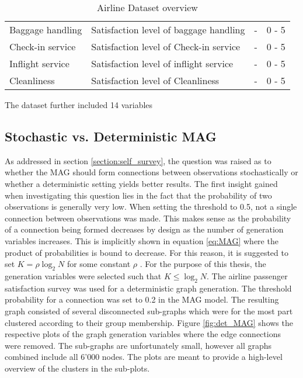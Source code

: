 \begin{landscape}
\begin{table}[h]
\begin{tabular}{|l|l|c|c|}
      Baggage handling & Satisfaction level of baggage handling & - & 0 - 5 \\
      Check-in service & Satisfaction level of Check-in service & - & 0 - 5 \\
      Inflight service & Satisfaction level of inflight service & - & 0 - 5 \\
      Cleanliness & Satisfaction level of Cleanliness & - & 0 - 5 \\
      \hline
    \end{tabular}
    \caption{Airline Dataset overview}
    \label{table:airline_summary}
  \end{table}
  \end{landscape}
  \newpage

  \noindent The dataset further included 14 variables 

  \subsection{Stochastic vs. Deterministic MAG}

  As addressed in section \ref{section:self_survey}, the question was raised 
  as to whether the MAG should form connections between observations
  stochastically or whether a deterministic setting yields better results. The 
  first insight gained when investigating this question lies in the fact that 
  the probability of two observations is generally very low. When setting the 
  threshold to 0.5, not a single connection between observations was made. This
  makes sense as the probability of a connection being formed decreases by
  design as the number of generation variables increases. This is implicitly
  shown in equation \ref{eq:MAG} where the product of probabilities is bound to
  decrease. For this reason, it is suggested to set $K=\rho\log_{2}N$
  for some constant $\rho$ \citep[p. 122]{kim2012multiplicative}. For the
  purpose of this thesis, the generation variables were selected such that
  $K\leqslant\log_{2} N$. The airline passenger satisfaction survey was used
  for a deterministic graph generation. The threshold probability for a
  connection was set to 0.2 in the MAG model. The resulting graph consisted of
  several disconnected sub-graphs which were for the most part clustered
  according to their group membership. Figure \ref{fig:det_MAG} shows the
  respective plots of the graph generation variables where the edge connections
  were removed. The sub-graphs are unfortunately small, however all graphs
  combined include all 6'000 nodes. The plots are meant to provide a high-level
  overview of the clusters in the sub-plots. 

